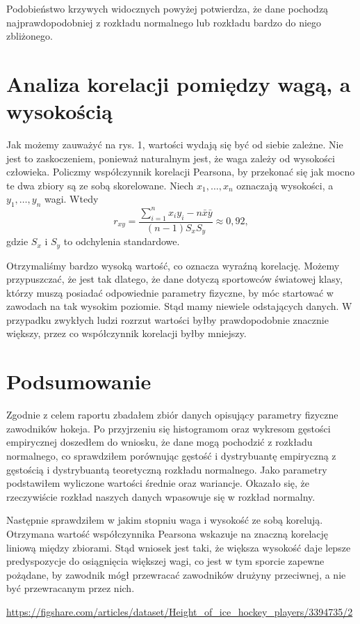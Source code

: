 \documentclass[12pt]{mwart}
\begin{document}
	\noindent Podobieństwo krzywych widocznych powyżej potwierdza, że dane pochodzą najprawdopodobniej z rozkładu normalnego lub rozkładu bardzo do niego zbliżonego.
	
	
	\section{Analiza korelacji pomiędzy wagą, a wysokością}
	
	Jak możemy zauważyć na rys. 1, wartości wydają się być od siebie zależne. Nie jest to zaskoczeniem, ponieważ naturalnym jest, że waga zależy od wysokości człowieka. Policzmy współczynnik korelacji Pearsona, by przekonać się jak mocno te dwa zbiory są ze sobą skorelowane. Niech $x_1, \dots, x_n$ oznaczają wysokości, a $y_1, \dots, y_n$ wagi. Wtedy
	$$ r_{xy} = \frac{\sum\limits_{i=1}^{n} x_i y_i - n\bar{x}\bar{y}}{(n - 1) S_x S_y} \approx 0,92, $$
	gdzie $S_x$ i $S_y$ to odchylenia standardowe.
	
	Otrzymaliśmy bardzo wysoką wartość, co oznacza wyraźną korelację. Możemy przypuszczać, że jest tak dlatego, że dane dotyczą sportowców światowej klasy, którzy muszą posiadać odpowiednie parametry fizyczne, by móc startować w zawodach na tak wysokim poziomie. Stąd mamy niewiele odstających danych. W przypadku zwykłych ludzi rozrzut wartości byłby prawdopodobnie znacznie większy, przez co współczynnik korelacji byłby mniejszy.
 	
 	
	\section{Podsumowanie}
	Zgodnie z celem raportu zbadałem zbiór danych opisujący parametry fizyczne zawodników hokeja. Po przyjrzeniu się histogramom oraz wykresom gęstości empirycznej doszedłem do wniosku, że dane mogą pochodzić z rozkładu normalnego, co sprawdziłem porównując gęstość i dystrybuantę empiryczną z gęstością i dystrybuantą teoretyczną rozkładu normalnego. Jako parametry podstawiłem wyliczone wartości średnie oraz wariancje. Okazało się, że rzeczywiście rozkład naszych danych wpasowuje się w rozkład normalny.
	
	Następnie sprawdziłem w jakim stopniu waga i wysokość ze sobą korelują. Otrzymana wartość współczynnika Pearsona wskazuje na znaczną korelację liniową między zbiorami. Stąd wniosek jest taki, że większa wysokość daje lepsze predyspozycje do osiągnięcia większej wagi, co jest w tym sporcie zapewne pożądane, by zawodnik mógł przewracać zawodników drużyny przeciwnej, a nie być przewracanym przez nich.
	
	
	\newpage
	\begin{thebibliography}{1}
		\url{https://figshare.com/articles/dataset/Height_of_ice_hockey_players/3394735/2}
	\end{thebibliography}
\end{document}
